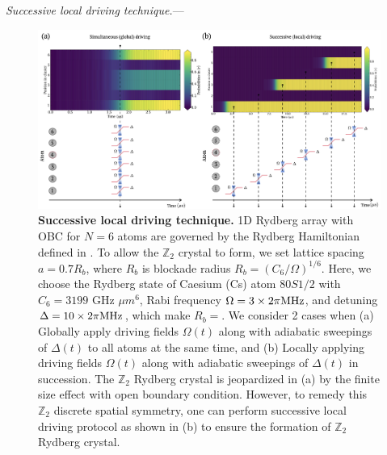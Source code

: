 \documentclass[%
 reprint,
nofootinbib,
 amsmath,amssymb,
 aps,
pra,
floatfix,
]{revtex4-2}
\begin{document}
\emph{Successive local driving technique.}--- 
\begin{figure}[ht!]
    \centering
    \includegraphics[width=14cm]{picture/successive_driving.png}
    \caption{\textbf{Successive local driving technique.} 1D Rydberg array with OBC for $N=6$ atoms are governed by the Rydberg Hamiltonian defined in \cite{Bernien2017ProbingSimulator}. To allow the $\mathbb{Z}_2$ crystal to form, we set lattice spacing $a = 0.7R_b$, where $R_b$ is blockade radius $R_b = (C_6/\Omega)^{1/6}$. Here, we choose the Rydberg state of Caesium (Cs) atom $80S1/2$ with $C_6 = 3199$ GHz $\mu m^6$, Rabi frequency $\Omega = 3 \times 2\pi \textit{\rm MHz}$, and detuning $\Delta = 10 \times 2\pi \textit{\rm MHz}$, which make $R_b=$. We consider 2 cases when (a) Globally apply driving fields $\Omega(t)$ along with adiabatic sweepings of $\Delta(t)$ to all atoms at the same time, and (b) Locally applying driving fields $\Omega(t)$ along with adiabatic sweepings of $\Delta(t)$ in succession. The $\mathbb{Z}_2$ Rydberg crystal is jeopardized in (a) by the finite size effect with open boundary condition. However, to remedy this $\mathbb{Z}_2$ discrete spatial symmetry, one can perform successive local driving protocol as shown in (b) to ensure the formation of $\mathbb{Z}_2$ Rydberg crystal.}
    \label{fig:successinve_driving}
\end{figure}
\end{document}
